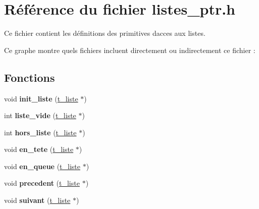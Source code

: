 \hypertarget{a00025}{}\section{Référence du fichier listes\+\_\+ptr.\+h}
\label{a00025}


Ce fichier contient les définitions des primitives d\textquotesingle{}acces aux listes.  


Ce graphe montre quels fichiers incluent directement ou indirectement ce fichier \+:
\subsection*{Fonctions}
\begin{DoxyCompactItemize}
\item 
void {\bfseries init\+\_\+liste} (\hyperlink{a00006}{t\+\_\+liste} $\ast$)\hypertarget{a00025_a0b7627ef2c1e9cb96d38a17a29577f5a}{}\label{a00025_a0b7627ef2c1e9cb96d38a17a29577f5a}

\item 
int {\bfseries liste\+\_\+vide} (\hyperlink{a00006}{t\+\_\+liste} $\ast$)\hypertarget{a00025_a65c75ddf120e39fbe7a609133d6381eb}{}\label{a00025_a65c75ddf120e39fbe7a609133d6381eb}

\item 
int {\bfseries hors\+\_\+liste} (\hyperlink{a00006}{t\+\_\+liste} $\ast$)\hypertarget{a00025_ab0752564ea5cc0cdedb92ab6c2c1a4fe}{}\label{a00025_ab0752564ea5cc0cdedb92ab6c2c1a4fe}

\item 
void {\bfseries en\+\_\+tete} (\hyperlink{a00006}{t\+\_\+liste} $\ast$)\hypertarget{a00025_a4859153f0b34828b3c94a9fa49e5d395}{}\label{a00025_a4859153f0b34828b3c94a9fa49e5d395}

\item 
void {\bfseries en\+\_\+queue} (\hyperlink{a00006}{t\+\_\+liste} $\ast$)\hypertarget{a00025_a3046dd762463c20f50c9340b336e3cd8}{}\label{a00025_a3046dd762463c20f50c9340b336e3cd8}

\item 
void {\bfseries precedent} (\hyperlink{a00006}{t\+\_\+liste} $\ast$)\hypertarget{a00025_aad7a7dd66733adc89aef2d28cb189a74}{}\label{a00025_aad7a7dd66733adc89aef2d28cb189a74}

\item 
void {\bfseries suivant} (\hyperlink{a00006}{t\+\_\+liste} $\ast$)\hypertarget{a00025_a2cb38086c4d55c7d8e8e82f74ca85eae}{}\label{a00025_a2cb38086c4d55c7d8e8e82f74ca85eae}


\end{DoxyCompactItemize}
